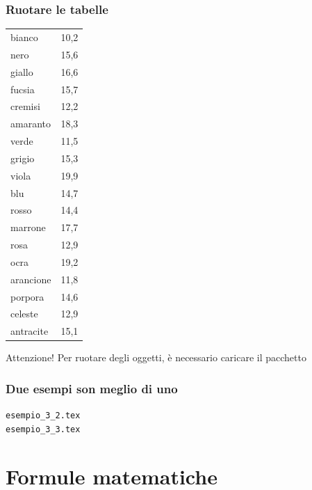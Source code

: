 \documentclass[svgnames,%
	ucs,%
	pdftex]{guitbeamer}
\begin{document}
\begin{frame}
  \frametitle{Ruotare le tabelle}
	\begin{LaTeXoutput}
		\begin{sideways}
		\begin{tabular}{lr}\\\hline
		bianco 		& 10,2 \\
		nero   		& 15,6 \\
		giallo		& 16,6 \\
		fucsia		& 15,7 \\
		cremisi		& 12,2 \\
		amaranto	& 18,3 \\
		verde		& 11,5 \\
		grigio		& 15,3 \\
		viola		& 19,9 \\
		blu		& 14,7 \\
		rosso		& 14,4 \\
		marrone		& 17,7 \\
		rosa		& 12,9 \\
		ocra		& 19,2 \\
		arancione	& 11,8 \\
		porpora		& 14,6 \\
		celeste		& 12,9 \\
		antracite	& 15,1 \\
		\hline
		\end{tabular}
		\end{sideways}
	\end{LaTeXoutput}
	\begin{block}{Attenzione!}
		Per ruotare degli oggetti, \`e necessario caricare il pacchetto 
	\end{block}
\end{frame}
\begin{frame}
  \frametitle{Due esempi son meglio di uno}
	\begin{center}
		\alert{\texttt{esempio\_3\_2.tex}}\\
		\alert{\texttt{esempio\_3\_3.tex}}
	\end{center}
\end{frame}
\section{Formule matematiche}
\end{document}

